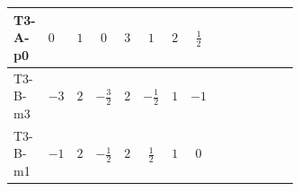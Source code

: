 \documentclass[8pt]{article}
\begin{document}
\begin{landscape}
\begin{longtable}{@{}llcccccc >{\raggedright\arraybackslash}p{0.21\linewidth} >{\raggedright\arraybackslash}p{0.21\linewidth} >{\raggedright\arraybackslash}p{0.21\linewidth}@{}}
\midrule
T3-A-p0 & $0$ & $1$ & $0$ & $3$ & $1$ & $2$ & $\frac{1}{2}$ & \scriptsize\adjustbox{max width=\linewidth}{$\begin{gathered} +\frac{3}{2} (\left({Y_d}\,\left({Y_d}\right)^{\dagger}\,{Y_d}\right)_{ij}-\left({Y_u}\,\left({Y_u}\right)^{\dagger}\,{Y_d}\right)_{ij})\end{gathered}$} & \scriptsize\adjustbox{max width=\linewidth}{$\begin{gathered} -\frac{9}{4} {g_2}^2 \left({Y_d}\right)_{ij}\end{gathered}$} & \scriptsize\adjustbox{max width=\linewidth}{$\begin{gathered} -8 {g_3}^2 \left({Y_d}\right)_{ij}\end{gathered}$} \\
\midrule
T3-B-m3 & $-3$ & $2$ & $-\frac{3}{2}$ & $2$ & $-\frac{1}{2}$ & $1$ & $-1$ & \scriptsize\adjustbox{max width=\linewidth}{$\begin{gathered} +\frac{3}{2} (\left({Y_d}\,\left({Y_d}\right)^{\dagger}\,{Y_d}\right)_{ij}-\left({Y_u}\,\left({Y_u}\right)^{\dagger}\,{Y_d}\right)_{ij})\end{gathered}$} & \scriptsize\adjustbox{max width=\linewidth}{$\begin{gathered} -\frac{9}{4} {g_2}^2 \left({Y_d}\right)_{ij}\end{gathered}$} & \scriptsize\adjustbox{max width=\linewidth}{$\begin{gathered} -8 {g_3}^2 \left({Y_d}\right)_{ij}\end{gathered}$} \\
\midrule
T3-B-m1 & $-1$ & $2$ & $-\frac{1}{2}$ & $2$ & $\frac{1}{2}$ & $1$ & $0$ & \scriptsize\adjustbox{max width=\linewidth}{$\begin{gathered} +\frac{3}{2} (\left({Y_d}\,\left({Y_d}\right)^{\dagger}\,{Y_d}\right)_{ij}-\left({Y_u}\,\left({Y_u}\right)^{\dagger}\,{Y_d}\right)_{ij})\end{gathered}$} & \scriptsize\adjustbox{max width=\linewidth}{$\begin{gathered} -\frac{9}{4} {g_2}^2 \left({Y_d}\right)_{ij}\end{gathered}$} & \scriptsize\adjustbox{max width=\linewidth}{$\begin{gathered} -8 {g_3}^2 \left({Y_d}\right)_{ij}\end{gathered}$} \\
\midrule

\end{longtable}
\end{landscape}
\end{document}
